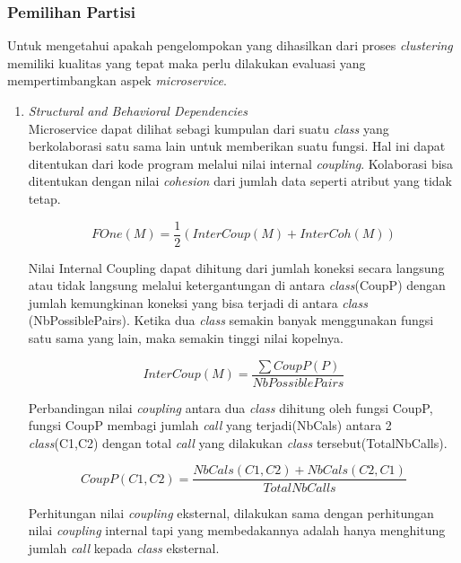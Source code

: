 \subsubsection{Pemilihan Partisi}
Untuk mengetahui apakah pengelompokan yang dihasilkan dari proses \textit{clustering} memiliki kualitas yang tepat maka perlu dilakukan evaluasi yang mempertimbangkan aspek \textit{microservice}.	
\begin{enumerate}[leftmargin=1.3cm]
	\item \textit{Structural and Behavioral Dependencies} \cite{5B1}\\
	Microservice dapat dilihat sebagi kumpulan dari suatu \textit{class} yang berkolaborasi satu sama lain untuk memberikan suatu fungsi. Hal ini dapat ditentukan dari kode program melalui nilai internal \textit{coupling}. Kolaborasi bisa ditentukan dengan nilai \textit{cohesion} dari jumlah data seperti atribut yang tidak tetap.

	\begin{equation}
		F O n e(M)=\frac{1}{2}(I n t e r C o u p(M)+I n t e r C o h(M))
		\label{eq:fone}
	\end{equation}
	
	Nilai Internal Coupling dapat dihitung dari jumlah koneksi secara langsung atau tidak langsung melalui ketergantungan di antara \textit{class}(CoupP) dengan jumlah kemungkinan koneksi yang bisa terjadi di antara \textit{class} (NbPossiblePairs). Ketika dua \textit{class} semakin banyak menggunakan fungsi satu sama yang lain, maka semakin tinggi nilai kopelnya. 

	\begin{equation}
		I n t e r C o u p(M)=\frac{\sum C o u p P(P)}{N b P o s s i b l e P a i r s}
		\label{eq:intercoup}
	\end{equation}
	
	Perbandingan nilai \textit{coupling} antara dua \textit{class} dihitung oleh fungsi CoupP, fungsi CoupP membagi jumlah \textit{call} yang terjadi(NbCals) antara 2 \textit{class}(C1,C2) dengan total \textit{call} yang dilakukan \textit{class} tersebut(TotalNbCalls).

	\begin{equation}
		C o u p P(C1,C2)={\frac{N b C a l s(C1,C2)+N b C a l s(C2,C1)}{T o t a l N b C a l l s}}
		\label{eq:coup}
	\end{equation}	
	
	Perhitungan nilai \textit{coupling} eksternal, dilakukan sama dengan perhitungan nilai \textit{coupling} internal tapi yang membedakannya adalah hanya menghitung jumlah \textit{call} kepada \textit{class} eksternal.
	

\end{enumerate}
